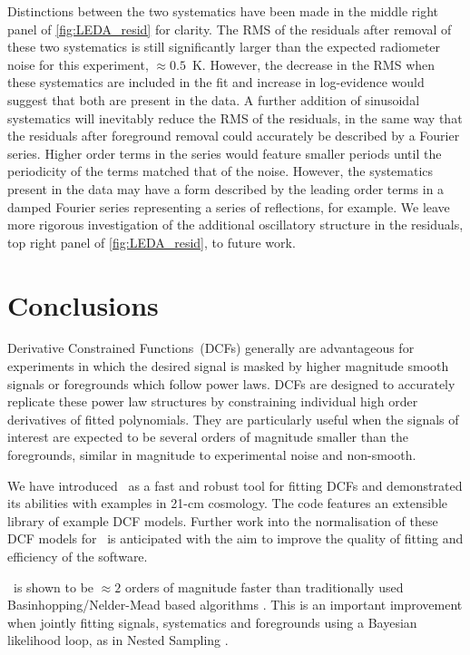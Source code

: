Distinctions between the two systematics have been made in the middle right panel of \cref{fig:LEDA_resid} for clarity. The RMS of the residuals after removal of these two systematics is still significantly larger than the expected radiometer noise for this experiment, $\approx 0.5$~K. However, the decrease in the RMS when these systematics are included in the fit and increase in log-evidence would suggest that both are present in the data. A further addition of sinusoidal systematics will inevitably reduce the RMS of the residuals, in the same way that the residuals after foreground removal could accurately be described by a Fourier series. Higher order terms in the series would feature smaller periods until the periodicity of the terms matched that of the noise. However, the systematics present in the data may have a form described by the leading order terms in a damped Fourier series representing a series of reflections, for example. We leave more rigorous investigation of the additional oscillatory structure in the residuals, top right panel of \cref{fig:LEDA_resid}, to future work.

\section{Conclusions}
\label{sec:maxsmooth_conclusions}

Derivative Constrained Functions~(DCFs) generally are advantageous for experiments in which the desired signal is masked by higher magnitude smooth signals or foregrounds which follow power laws. DCFs are designed to accurately replicate these power law structures by constraining individual high order derivatives of fitted polynomials. They are particularly useful when the signals of interest are expected to be several orders of magnitude smaller than the foregrounds, similar in magnitude to experimental noise and non-smooth.

We have introduced \maxsmooth~as a fast and robust tool for fitting DCFs and demonstrated its abilities with examples in 21-cm cosmology. The code features an extensible library of example DCF models. Further work into the normalisation of these DCF models for \maxsmooth~is anticipated with the aim to improve the quality of fitting and efficiency of the software.

\maxsmooth~is shown to be $\approx2$ orders of magnitude faster than traditionally used Basinhopping/Nelder-Mead based algorithms \cite{Sathyanarayana_msf_2017}. This is an important improvement when jointly fitting signals, systematics and foregrounds using a Bayesian likelihood loop, as in Nested Sampling \citep{Anstey_REACH_2021}.

